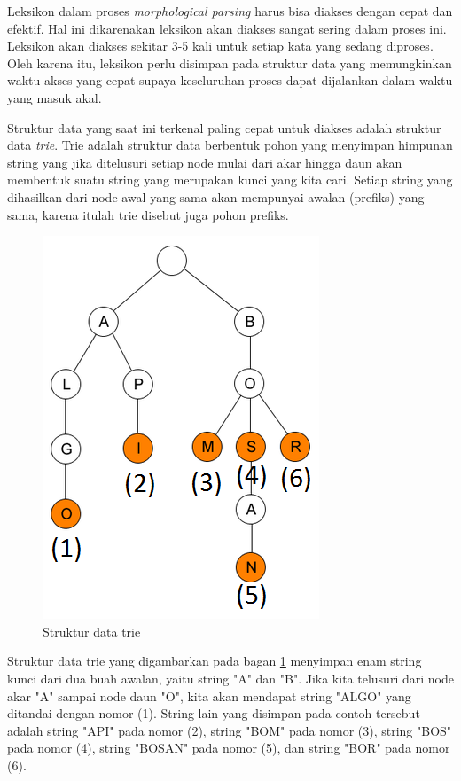 Leksikon dalam proses \textit{morphological parsing} harus bisa diakses dengan cepat dan efektif. Hal ini dikarenakan leksikon akan diakses sangat sering dalam proses ini. Leksikon akan diakses sekitar 3-5 kali untuk setiap kata yang sedang diproses. Oleh karena itu, leksikon perlu disimpan pada struktur data yang memungkinkan waktu akses yang cepat supaya keseluruhan proses dapat dijalankan dalam waktu yang masuk akal. 

Struktur data yang saat ini terkenal paling cepat untuk diakses adalah struktur data \textit{trie}. Trie adalah struktur data berbentuk pohon yang menyimpan himpunan string yang jika ditelusuri setiap node mulai dari akar hingga daun akan membentuk suatu string yang merupakan kunci yang kita cari. Setiap string yang dihasilkan dari node awal yang sama akan mempunyai awalan (prefiks) yang sama, karena itulah trie disebut juga pohon prefiks.

\begin{figure}[H]
\centering
\includegraphics[scale=0.75]{Gambar/gambar-trie}
\caption[Struktur data trie]{Struktur data trie} 
\label{bagan-trie}
\end{figure}

Struktur data trie yang digambarkan pada bagan \ref{bagan-trie} menyimpan enam string kunci dari dua buah awalan, yaitu string "A" dan "B". Jika kita telusuri dari node akar "A" sampai node daun "O", kita akan mendapat string "ALGO" yang ditandai dengan nomor (1). String lain yang disimpan pada contoh tersebut adalah string "API" pada nomor (2), string "BOM" pada nomor (3), string "BOS" pada nomor (4), string "BOSAN" pada nomor (5), dan string "BOR" pada nomor (6).

